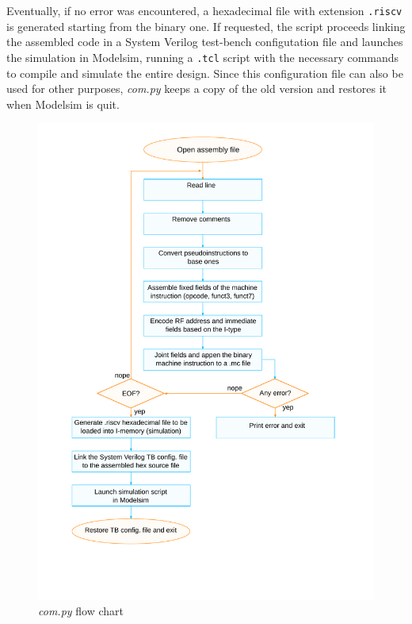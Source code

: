 Eventually, if no error was encountered, a hexadecimal file with extension \texttt{.riscv} is generated starting from the binary one. If requested, the script proceeds linking the assembled code in a System Verilog test-bench configutation file and launches the simulation in Modelsim, running a \texttt{.tcl} script with the necessary commands to compile and simulate the entire design. Since this configuration file can also be used for other purposes, \textit{com.py} keeps a copy of the old version and restores it when Modelsim is quit. 

\begin{figure}[hbtp]
   \centering
   \includegraphics[scale=.6]{../common/ref/schematic/compy.pdf}
   \caption{\textit{com.py} flow chart}
   \label{fig:compy}
\end{figure}